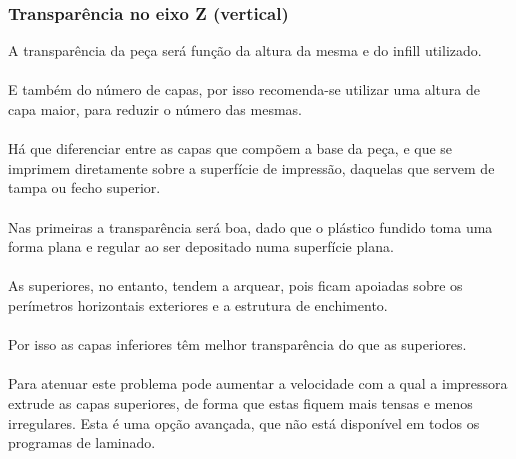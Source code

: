 \documentclass[11pt,a4paper]{article}
\begin{document}
		\subsubsection{Transparência no eixo Z (vertical)}A transparência da peça será função da altura da mesma e do infill utilizado.
\\\\
E também do número de capas, por isso recomenda-se utilizar uma altura de capa maior, para reduzir o número das mesmas.
\\\\
Há que diferenciar entre as capas que compõem a base da peça, e que se imprimem diretamente sobre a superfície de impressão, daquelas que servem de tampa ou fecho superior.
\\\\
Nas primeiras a transparência será boa, dado que o plástico fundido toma uma forma plana e regular ao ser depositado numa superfície plana.
\\\\
As superiores, no entanto, tendem a arquear, pois ficam apoiadas sobre os perímetros horizontais exteriores e a estrutura de enchimento.
\\\\
Por isso as capas inferiores têm melhor transparência do que as superiores.
\\\\
Para atenuar este problema pode aumentar a velocidade com a qual a impressora extrude as capas superiores, de forma que estas fiquem mais tensas e menos irregulares. Esta é uma opção avançada, que não está disponível em todos os programas de laminado.
\end{document}
